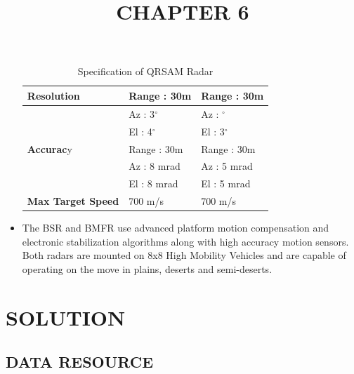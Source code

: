 \documentclass[14pt]{article} %
\begin{document}
\begin{itemize}
\begin{table}
{\begin{tabular}{p{}p{}p{}}
\textbf{Resolution} & Range : 30m& Range : 30m\\ \midrule
&Az   : 3$^{\circ}$ & Az    : $^{\circ}$\\
&El     : 4$^{\circ}$ & El     : 3$^{\circ}$\\ \midrule
\textbf{Accurac}y & Range : 30m & Range : 30m\\ 
&Az     : 8 mrad & Az      : 5 mrad\\
&El       : 8 mrad & El       : 5 mrad\\  \midrule
\textbf{Max Target Speed} & 700 m/s & 700 m/s\\ \bottomrule
\end{tabular}}
\caption{Specification of QRSAM Radar}
\end{table}

\item The BSR and BMFR use advanced platform motion compensation and electronic stabilization algorithms along with high accuracy motion sensors. Both radars are mounted on 8x8 High Mobility Vehicles and are capable of operating on the move in plains, deserts and semi-deserts.
\end{itemize}


\pagebreak

\title{CHAPTER 6}
\maketitle
\section{SOLUTION}

\subsection{DATA RESOURCE}
\end{document}
